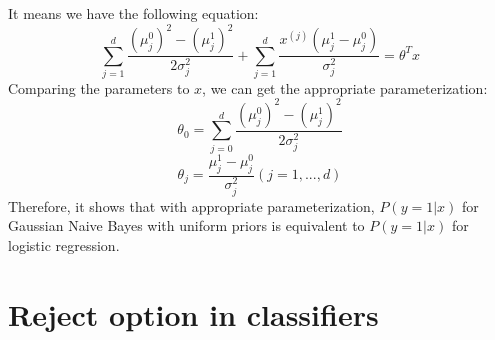 \documentclass[paper=a4, fontsize=11pt]{scrartcl} %
\numberwithin{equation}{section} %
\numberwithin{figure}{section} %
\numberwithin{table}{section} %
\begin{document}
It means we have the following equation:
\begin{equation*}
\sum_{j=1}^{d}\frac{\left ( \mu _{j}^{0} \right )^{2}-\left ( \mu _{j}^{1} \right )^{2}}{2\sigma _{j}^{2}}+\sum_{j=1}^{d}\frac{x^{\left ( j \right )}\left ( \mu _{j}^{1}-\mu_{j}^{0} \right )}{\sigma _{j}^{2}}=\theta ^{T}x
\end{equation*}
Comparing the parameters to $x$, we can get the appropriate parameterization:
\begin{equation*}
\theta _{0}=\sum_{j=0}^{d}\frac{\left ( \mu _{j}^{0} \right )^{2}-\left ( \mu _{j}^{1} \right )^{2}}{2\sigma _{j}^{2}}
\end{equation*}
\begin{equation*}
\theta _{j}=\frac{\mu _{j}^{1}-\mu_{j}^{0} }{\sigma _{j}^{2}}\left ( j=1,...,d \right )
\end{equation*}
Therefore, it shows that with appropriate parameterization, $P\left ( y=1|x \right )$ for Gaussian Naive Bayes with uniform priors is equivalent to $P\left ( y=1|x \right )$ for logistic regression.

\section{Reject option in classifiers}
\end{document}
